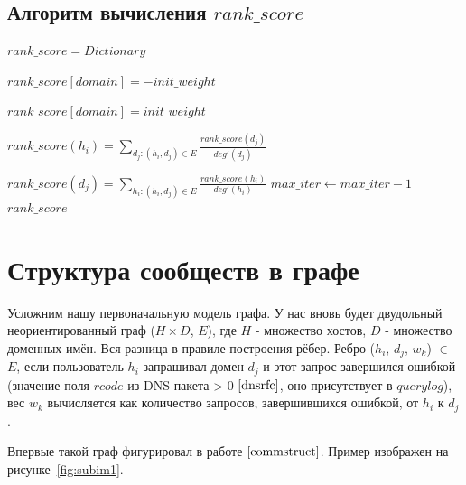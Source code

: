\documentclass[a4paper,14pt]{extreport} %
\begin{document}
\subsection{Алгоритм вычисления $rank\_score$}
\begin{algorithmic}
	\State $rank\_score = Dictionary$
			
	\State $rank\_score[domain] = -init\_weight$
	\EndFor
			
	\State $rank\_score[domain] = init\_weight$
	\EndFor
		
	\State $rank\_score(h_i) = \sum_{d_j: (h_i, d_j)\in E} \frac{rank\_score(d_j)}{deg'(d_j)}$
	\EndFor
				
	\State $rank\_score(d_j) = \sum_{h_i: (h_i, d_j)\in E} \frac{rank\_score(h_i)}{deg'(h_i)}$
	\EndFor
	\State $max\_iter\gets max\_iter-1$
	\EndWhile
	\State \Return $rank\_score$
	\EndFunction
\end{algorithmic}

\section{Структура сообществ в графе}
\label{ssec:communitystruct}
Усложним нашу первоначальную модель графа. У нас вновь будет двудольный неориентированный граф ($H\times D$, $E$), где $H$ - множество хостов, $D$ - множество доменных имён. Вся разница в правиле построения рёбер. Ребро ($h_i$, $d_j$, $w_k$) $\in$ $E$, если пользователь $h_i$ запрашивал домен $d_j$ и этот запрос завершился ошибкой (значение поля $rcode$ из DNS-пакета > 0 $\cite{dnsrfc}$, оно присутствует в $querylog$), вес $w_k$ вычисляется как количество запросов, завершившихся ошибкой, от $h_i$ к $d_j$. 

Впервые такой граф фигурировал в работе $\cite{commstruct}$. Пример изображен на рисунке~\ref{fig:subim1}. 
\end{document}
